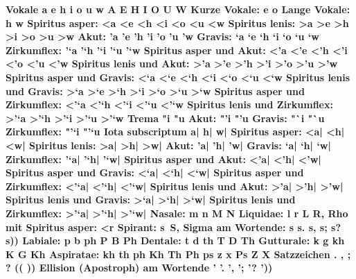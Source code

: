 
\obeylines
\noindent \bf Vokale
\agr a e h i o u w A E H I O U W\rm
Kurze Vokale: \agr e o\rm
Lange Vokale: \agr h w\rm
\medskip {}
Spiritus asper: \agr <a <e <h <i <o <u <w \rm
Spiritus lenis: \agr >a >e >h >i >o >u >w \rm
\medskip {}
Akut: \agr 'a 'e 'h 'i 'o 'u 'w \rm
Gravis: \agr `a `e `h `i `o `u `w \rm
Zirkumflex: \agr '`a '`h '`i '`u '`w \rm
\medskip {}
Spiritus asper und Akut: \agr <'a <'e <'h <'i <'o <'u <'w\rm
Spiritus lenis und Akut: \agr >'a >'e >'h >'i >'o >'u >'w\rm
Spiritus asper und Gravis: \agr <`a <`e <`h <`i <`o <`u <`w\rm
Spiritus lenis und Gravis: \agr >`a >`e >`h >`i >`o >`u >`w\rm
Spiritus asper und Zirkumflex: \agr <'`a <'`h <'`i <'`u <'`w\rm
Spiritus lenis und Zirkumflex: \agr >'`a >'`h >'`i >'`u >'`w\rm
\medskip \noindent\bf Trema
\agr "i "u\rm
\medskip {}
Akut: \agr "'i "'u\rm
Gravis: \agr "`i "`u\rm
Zirkumflex: \agr "'`i "'`u\rm
\medskip \noindent\bf Iota subscriptum
\agr a| h| w|\rm
\medskip {}
Spiritus asper: \agr <a| <h| <w|\rm
Spiritus lenis: \agr >a| >h| >w|\rm
\medskip {}
Akut: \agr 'a| 'h| 'w|\rm
Gravis: \agr `a| `h| `w|\rm
Zirkumflex: \agr '`a| '`h| '`w|\rm
\medskip {}
Spiritus asper und Akut: \agr <'a| <'h| <'w|\rm
Spiritus asper und Gravis: \agr <`a| <`h| <`w|\rm
Spiritus asper und Zirkumflex: \agr <'`a| <'`h| <'`w|\rm
Spiritus lenis und Akut: \agr >'a| >'h| >'w|\rm
Spiritus lenis und Gravis: \agr >`a| >`h| >`w|\rm
Spiritus lenis und Zirkumflex: \agr >'`a| >'`h| >'`w|\rm
\medskip{}
Nasale: \agr m n M N\rm
Liquidae: \agr l r L R\rm, Rho mit Spiritus asper: \agr <r\rm
Spirant: \agr s\noboundary\ S\rm, Sigma am Wortende: \agr s s. s, s; s?  s))\rm
\filbreak
{}
Labiale: \agr p b ph P B Ph\rm
Dentale: \agr t d th T D Th\rm
Gutturale: \agr k g kh K G Kh\rm
Aspiratae: \agr kh th ph Kh Th Ph\rm
\medskip
{}
\agr ps z x Ps Z X\rm
\medskip
\noindent \bf Satzzeichen
\agr . , ; ? (( ))\rm
\medskip
\noindent \bf Ellision (Apostroph) am Wortende
\agr ' '. ', '; '? '))
\bye
